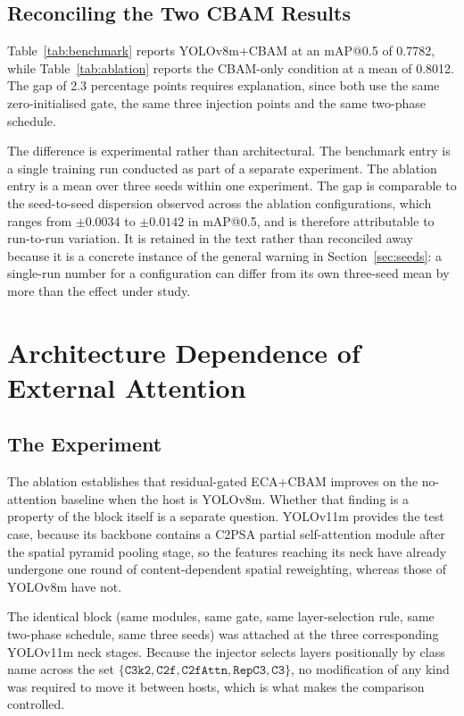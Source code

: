 \documentclass[MScCS]{uccthesis}
\begin{document}
\subsection{Reconciling the Two CBAM Results}

Table~\ref{tab:benchmark} reports YOLOv8m+CBAM at an mAP@0.5 of 0.7782, while
Table~\ref{tab:ablation} reports the CBAM-only condition at a mean of 0.8012.
The gap of 2.3 percentage points requires explanation, since both use the same
zero-initialised gate, the same three injection points and the same two-phase
schedule.

The difference is experimental rather than architectural. The benchmark entry
is a single training run conducted as part of a separate experiment. The
ablation entry is a mean over three seeds within one experiment. The gap is
comparable to the seed-to-seed dispersion observed across the ablation
configurations, which ranges from $\pm 0.0034$ to $\pm 0.0142$ in mAP@0.5, and
is therefore attributable to run-to-run variation. It is retained in the text
rather than reconciled away because it is a concrete instance of the general
warning in Section~\ref{sec:seeds}: a single-run number for a configuration can
differ from its own three-seed mean by more than the effect under study.

\section{Architecture Dependence of External Attention}
\label{sec:results_saturation}

\subsection{The Experiment}

The ablation establishes that residual-gated ECA+CBAM improves on the
no-attention baseline when the host is YOLOv8m. Whether that finding is a
property of the block itself is a separate question. YOLOv11m provides the test
case, because its
backbone contains a C2PSA partial self-attention module after the spatial
pyramid pooling stage, so the features reaching its neck have already undergone
one round of content-dependent spatial reweighting, whereas those of YOLOv8m
have not.

The identical block (same modules, same gate, same layer-selection rule, same
two-phase schedule, same three seeds) was attached at the three corresponding
YOLOv11m neck stages. Because the injector selects layers positionally by class
name across the set
$\{\texttt{C3k2}, \texttt{C2f}, \texttt{C2fAttn}, \texttt{RepC3}, \texttt{C3}\}$,
no modification of any kind was required to move it between hosts, which is
what makes the comparison controlled.
\end{document}
